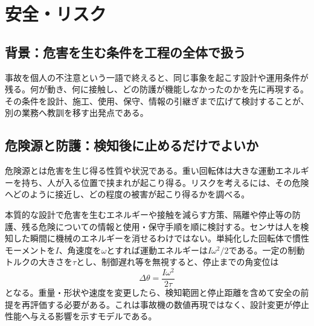 \chapter{安全・リスク}
\section{背景：危害を生む条件を工程の全体で扱う}
事故を個人の不注意という一語で終えると、同じ事象を起こす設計や運用条件が残る。何が動き、何に接触し、どの防護が機能しなかったのかを先に再現する。その条件を設計、施工、使用、保守、情報の引継ぎまで広げて検討することが、別の業務へ教訓を移す出発点である。

\section{危険源と防護：検知後に止めるだけでよいか}
\label{theory:safety:barriers}
危険源とは危害を生じ得る性質や状況である。重い回転体は大きな運動エネルギーを持ち、人が入る位置で挟まれが起こり得る。リスクを考えるには、その危険へどのように接近し、どの程度の被害が起こり得るかを調べる。

本質的な設計で危害を生むエネルギーや接触を減らす方策、隔離や停止等の防護、残る危険についての情報と使用・保守手順を順に検討する。センサは人を検知した瞬間に機械のエネルギーを消せるわけではない。単純化した回転体で慣性モーメントを\(I\)、角速度を\(\omega\)とすれば運動エネルギーは\(I\omega^2/2\)である。一定の制動トルクの大きさを\(\tau\)とし、制御遅れ等を無視すると、停止までの角変位は
\[
 \Delta\theta=\frac{I\omega^2}{2\tau}
\]
となる。重量・形状や速度を変更したら、検知範囲と停止距離を含めて安全の前提を再評価する必要がある。これは事故機の数値再現ではなく、設計変更が停止性能へ与える影響を示すモデルである。

